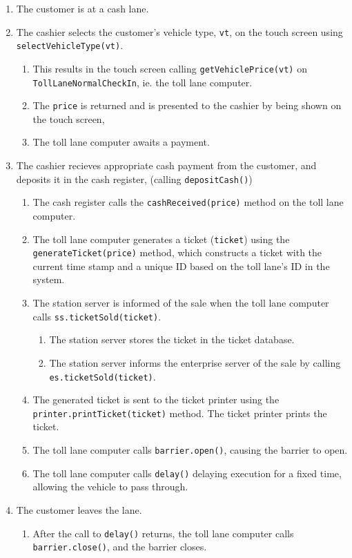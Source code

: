 \begin{enumerate}
\item The customer is at a cash lane.
\item The cashier selects the customer's vehicle type, \texttt{vt}, on the touch screen using \texttt{selectVehicleType(vt)}.
	\begin{enumerate}
	\item This results in the touch screen calling \texttt{getVehiclePrice(vt)} on \texttt{TollLaneNormalCheckIn}, ie. the toll lane computer. 
	\item The \texttt{price} is returned and is presented to the cashier by being shown on the touch screen, 
	\item The toll lane computer awaits a payment.
	\end{enumerate}
\item The cashier recieves appropriate cash payment from the customer, and deposits it in the cash register, (calling \texttt{depositCash()})
	\begin{enumerate}
	\item The cash register calls the \texttt{cashReceived(price)} method on the toll lane computer.
	\item \label{generate_ticket} The toll lane computer generates a ticket (\texttt{ticket}) using the \texttt{generateTicket(price)} method, which constructs a ticket with the current time stamp and a unique ID based on the toll lane's ID in the system.
	\item The station server is informed of the sale when the toll lane computer calls \texttt{ss.ticketSold(ticket)}.
		\begin{enumerate}
		\item The station server stores the ticket in the ticket database.
		\item The station server informs the enterprise server of the sale by calling \texttt{es.ticketSold(ticket)}.
		\end{enumerate}
	\item The generated ticket is sent to the ticket printer using the \texttt{printer.printTicket(ticket)} method. The ticket printer prints the ticket.
	\item The toll lane computer calls \texttt{barrier.open()}, causing the barrier to open.
	\item The toll lane computer calls \texttt{delay()} delaying execution for a fixed time, allowing the vehicle to pass through.
	\end{enumerate}
	\item The customer leaves the lane.
	\begin{enumerate}
	\item After the call to \texttt{delay()} returns, the toll lane computer calls \texttt{barrier.close()}, and the barrier closes.
	\end{enumerate}
	
\end{enumerate}


